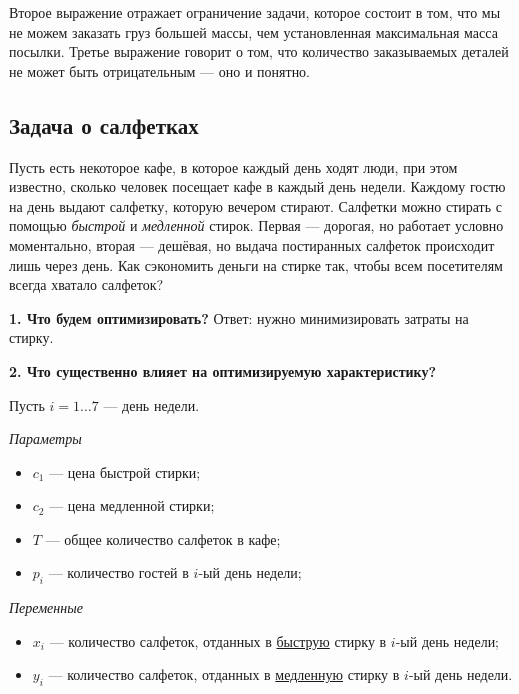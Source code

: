 Второе выражение отражает ограничение задачи, которое состоит в том, что мы не можем заказать груз большей массы, чем установленная максимальная масса посылки. Третье выражение говорит о том, что количество заказываемых деталей не может быть отрицательным --- оно и понятно.

\subsection{Задача о салфетках}\label{pr:napkins}

Пусть есть некоторое кафе, в которое каждый день ходят люди, при этом известно, сколько человек посещает кафе в каждый день недели. Каждому гостю на день выдают салфетку, которую вечером стирают. Салфетки можно стирать с помощью \textit{быстрой} и \textit{медленной} стирок. Первая --- дорогая, но работает условно моментально, вторая --- дешёвая, но выдача постиранных салфеток происходит лишь через день. Как сэкономить деньги на стирке так, чтобы всем посетителям всегда хватало салфеток?

\bigskip

\textbf{1. Что будем оптимизировать?} Ответ: нужно минимизировать затраты на стирку.

\bigskip

\textbf{2. Что существенно влияет на оптимизируемую характеристику?}

Пусть $i = 1 \dots 7$ --- день недели.

\bigskip

\textit{Параметры}

\begin{itemize}[nosep]	
	\item $c_1$ --- цена быстрой стирки;
	
	\item $c_2$ --- цена медленной стирки;
	
	\item $T$ --- общее количество салфеток в кафе;
	
	\item $p_i$ --- количество гостей в $i$-ый день недели;
\end{itemize}

\bigskip

\textit{Переменные}

\begin{itemize}[nosep]	
	\item $x_i$ --- количество салфеток, отданных в \underline{быструю} стирку в $i$-ый день недели;
	
	\item $y_i$ --- количество салфеток, отданных в \underline{медленную} стирку в $i$-ый день недели.
\end{itemize}

